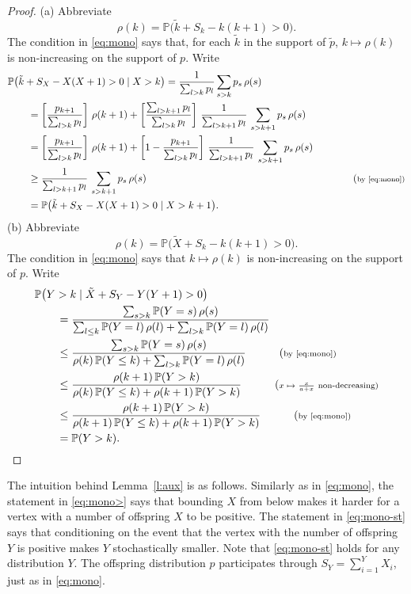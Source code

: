 \documentclass[11pt]{article}
\numberwithin{equation}{section}
\theoremstyle{plain}
\newcommand{\PP}{\mathbb{P}}
\newcommand{\tX}{\tilde{X}}
\newcommand{\tk}{\tilde{k}}
\begin{document}
\begin{proof}
(a) Abbreviate
\[
\rho(k)=\PP\big(\tk + S_k - k(k+1)>0\big).
\]
The condition in \eqref{eq:mono} says that, for each $\tk$ in the support of $\tilde{p}$, $k \mapsto \rho(k)$ is non-increasing on the support of $p$. Write
\begin{align*}
&\PP\big(\tk + S_X - X(X+1)>0\mid X>k\big) = \frac{1}{\sum_{l>k} p_l} \sum_{s>k} p_s\,\rho(s)\\
&\qquad = \left[\frac{p_{k+1}}{\sum_{l > k} p_l}\right]\,\rho(k+1)
+ \left[\frac{\sum_{l > k+1} p_l}{\sum_{l > k} p_l}\right] 
\,\frac{1}{\sum_{l > k+1} p_l}\,\sum_{s > k+1} p_s\,\rho(s)\\
&\qquad = \left[\frac{p_{k+1}}{\sum_{l > k} p_l}\right]\,\rho(k+1)
+ \left[1-\frac{p_{k+1}}{\sum_{l > k} p_l}\right] \,
\frac{1}{\sum_{l > k+1} p_l}\,\sum_{s > k+1} p_s\,\rho(s)\\
&\qquad \geq \frac{1}{\sum_{l > k+1} p_l}\,\sum_{s > k+1} p_s\,\rho(s) 
&\quad \tag{\scriptsize by \eqref{eq:mono}}\\
&\qquad = \PP\big(\tk + S_X - X(X+1)>0\mid X>k+1\big).
\end{align*}
(b) Abbreviate
\[
\rho(k)=\PP\big(\tX + S_k - k(k+1)>0\big).
\]
The condition in \eqref{eq:mono} says that $k \mapsto \rho(k)$ is non-increasing on the support of $p$. Write
\begin{align*}
&\PP\big(Y > k \mid \tX + S_Y - Y(Y+1) > 0\big)\\ 
&\qquad = \frac{\sum_{s>k} \PP(Y=s)\,\rho(s)}{\sum_{l \leq k} \PP(Y=l)\,\rho(l) 
+ \sum_{l> k} \PP(Y=l)\,\rho(l)}\\
&\qquad \leq \frac{\sum_{s>k} \PP(Y=s)\,\rho(s)}{\rho(k)\,\PP(Y\leq k)
+\sum_{l> k }\PP(Y=l)\,\rho(l)} \quad \tag{\scriptsize by \eqref{eq:mono}}\\
&\qquad \leq \frac{\rho(k+1)\,\PP(Y>k)}{\rho(k)\,\PP(Y\leq k)
+ \rho(k+1)\,\PP(Y>k)} \quad \tag{\scriptsize $x \mapsto \frac{x}{a+x}$ non-decreasing}\\
&\qquad \leq \frac{\rho(k+1)\,\PP(Y>k)}{\rho(k+1)\,\PP(Y \leq k) + \rho(k+1)\,\PP(Y>k)}
\quad \tag{\scriptsize by \eqref{eq:mono}}\\
&\qquad = \PP(Y>k).
\end{align*}
\end{proof}

\noindent
The intuition behind Lemma~\ref{l:aux} is as follows. Similarly as in \eqref{eq:mono}, the statement in \eqref{eq:mono>} says that bounding $X$ from below makes it harder for a vertex with a number of offspring $X$ to be positive.  The statement in \eqref{eq:mono-st} says that conditioning on the event that the vertex with the number of offspring $Y$ is positive makes $Y$ stochastically smaller. Note that \eqref{eq:mono-st} holds for any distribution $Y$. The offspring distribution $p$ participates through $S_Y = \sum_{i=1}^Y X_i$, just as in \eqref{eq:mono}. 
\end{document}
